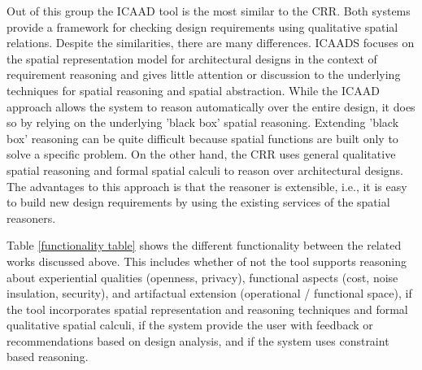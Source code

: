 \documentclass[12pt]{ucthesis}
\begin{document}
\begin{table}[H]
  \begin{center}
  \end{center}
\caption{System Objectives}
\label{related works table}
\end{table}   

Out of this group the ICAAD tool is the most similar to the CRR. Both systems provide a framework for checking design requirements using qualitative spatial relations. Despite the similarities, there are many differences. ICAADS focuses on the spatial representation model for architectural designs in the context of requirement reasoning and gives little attention or discussion to the underlying techniques for spatial reasoning and spatial abstraction. While the ICAAD approach allows the system to reason automatically over the entire design, it does so by relying on the underlying 'black box' spatial reasoning. Extending 'black box' reasoning can be quite difficult because spatial functions are built only to solve a specific problem. On the other hand, the CRR uses general qualitative spatial reasoning and formal spatial calculi to reason over architectural designs. The advantages to this approach is that the reasoner is extensible, i.e., it is easy to build new design requirements by using the existing services of the spatial reasoners.  


Table \ref{functionality table} shows the different functionality between the related works discussed above. This includes whether of not the tool supports reasoning about experiential qualities (openness, privacy), functional aspects (cost, noise insulation, security), and artifactual extension (operational / functional space), if the tool incorporates spatial representation and reasoning techniques and formal qualitative spatial calculi, if the system provide the user with feedback or recommendations based on design analysis, and if the system uses constraint based reasoning.
\end{document}
